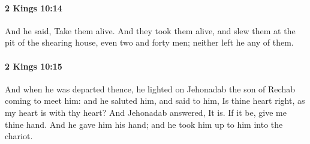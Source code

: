 		\paragraph{2 Kings 10:14} %
			\label{2KINGS-10-14}

			And he said, Take them alive. And they took them alive, and slew them at the pit of the shearing house, even two and forty men; neither left he any of them.


		\paragraph{2 Kings 10:15} %
			\label{2KINGS-10-15}

			And when he was departed thence, he lighted on Jehonadab the son of Rechab coming to meet him: and he saluted him, and said to him, Is thine heart right, as my heart is with thy heart? And Jehonadab answered, It is. If it be, give me thine hand. And he gave him his hand; and he took him up to him into the chariot.

